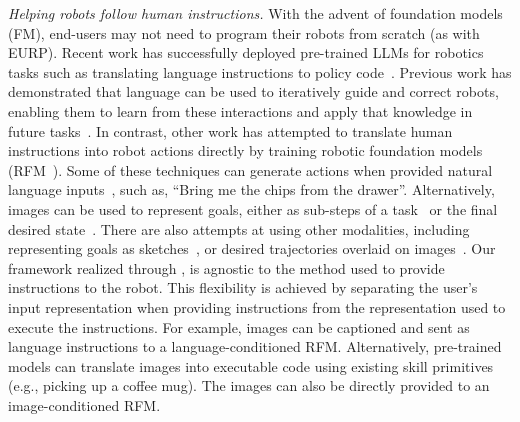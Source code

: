\noindent \emph{Helping robots follow human instructions.} With the advent of foundation models (FM), end-users may not need to program their robots from scratch (as with EURP). Recent work has successfully deployed pre-trained LLMs for robotics tasks such as translating language instructions to policy code~\cite{liang2023code, singh2023progprompt, liu2024ok, mahadevan2024generative}. Previous work has demonstrated that language can be used to iteratively guide and correct robots, enabling them to learn from these interactions and apply that knowledge in future tasks~\cite{zha2023distilling, liang2024learning}. In contrast, other work has attempted to translate human instructions into robot actions directly by training robotic foundation models (RFM~\cite{kawaharazuka2024real}). Some of these techniques can generate actions when provided natural language inputs~\cite{driess2023palm, kim2024openvla}, such as, ``Bring me the chips from the drawer''. Alternatively, images can be used to represent goals, either as sub-steps of a task~\cite{black2023zero, nair2020contextual} or the final desired state~\cite{team2024octo, kapelyukh2023dall}. There are also attempts at using other modalities, including representing goals as sketches~\cite{sundaresan2024rt}, or desired trajectories overlaid on images~\cite{gu2023rt}. Our framework realized through \projname, is agnostic to the method used to provide instructions to the robot. This flexibility is achieved by separating the user's input representation when providing instructions from the representation used to execute the instructions. For example, images can be captioned and sent as language instructions to a language-conditioned RFM. Alternatively, pre-trained models can translate images into executable code using existing skill primitives (e.g., picking up a coffee mug). The images can also be directly provided to an image-conditioned RFM.




